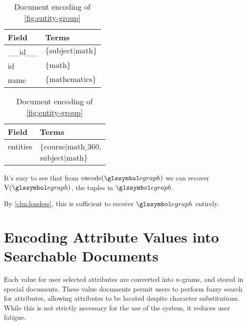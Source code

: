 \begin{ex}
\begin{table}[H]
\begin{subtable}[b]{0.33\linewidth}
					\begin{tabular}{ll}
						\toprule
						Field & Terms \\
						\midrule
						\_\_id\_\_ & \(\{\text{subject|math}\}\) \\
						id & \(\{\text{math}\}\) \\
						name & \(\{\text{mathematics}\}\) \\
						\bottomrule
					\end{tabular}
					
					\caption{Subject}
				\end{subtable}
				\begin{subtable}[b]{0.33\linewidth}
					\centering
					
					\begin{tabular}{ll}
						\toprule
						Field & Terms \\
						\midrule
						entities & \(\{\text{course|math\_360}\), \\
						& \(\text{subject|math}\}\) \\
						\bottomrule
					\end{tabular}
					
					\caption{Indexing document}
				\end{subtable}
				
				\caption{Document encoding of \vref{fig:entity-group}}
				\label{tbl:document-encoding}
			\end{table}
		\end{ex}
		
		It's easy to see that from \(\text{encode}(\egraph)\) we can recover \(\text{V}(\egraph)\), the tuples in \(\egraph\).
		
		By \vref{clm:lossless}, this is sufficient to recover \(\egraph\) entirely.
	
	\section{Encoding Attribute Values into Searchable Documents}
		Each value for user selected attributes are converted into \(n\)-grams, and stored in special documents.  These value documents permit users to perform fuzzy search for attributes, allowing attributes to be located despite character substitutions.  While this is not strictly necessary for the use of the system, it reduces user fatigue.
		
		
		
